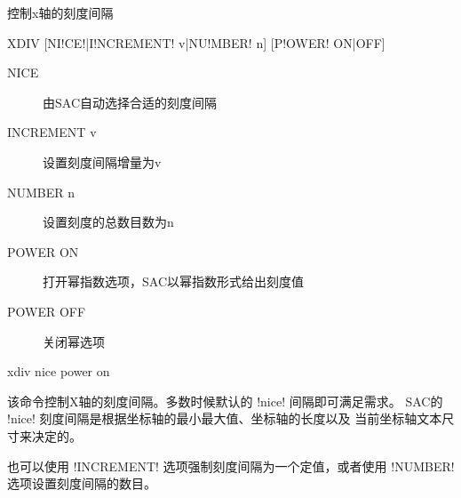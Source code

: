 \label{cmd:xdiv}

控制x轴的刻度间隔

\begin{SACSTX}
XDIV [NI!CE!|I!NCREMENT! v|NU!MBER! n] [P!OWER! ON|OFF]
\end{SACSTX}

\begin{description}
\item [NICE] 由SAC自动选择合适的刻度间隔
\item [INCREMENT v] 设置刻度间隔增量为v
\item [NUMBER n] 设置刻度的总数目数为n
\item [POWER ON] 打开幂指数选项，SAC以幂指数形式给出刻度值
\item [POWER OFF] 关闭幂选项
\end{description}

\begin{SACDFT}
xdiv nice power on
\end{SACDFT}

该命令控制X轴的刻度间隔。多数时候默认的 !nice! 间隔即可满足需求。
SAC的 !nice! 刻度间隔是根据坐标轴的最小最大值、坐标轴的长度以及
当前坐标轴文本尺寸来决定的。

也可以使用 !INCREMENT! 选项强制刻度间隔为一个定值，或者使用
!NUMBER! 选项设置刻度间隔的数目。
